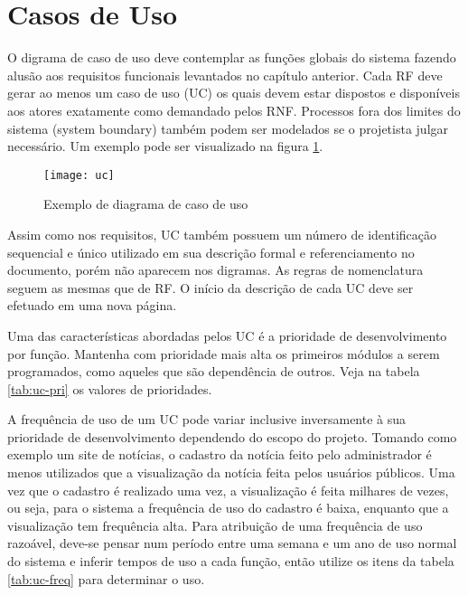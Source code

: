 \documentclass[12pt,openright,a4paper,brazil]{abntex2}
\begin{document}
\section{Casos de Uso}

O digrama de caso de uso deve contemplar as funções globais do sistema fazendo alusão aos requisitos funcionais levantados no capítulo anterior. Cada RF deve gerar ao menos um caso de uso (UC) os quais devem estar dispostos e disponíveis aos atores exatamente como demandado pelos RNF. Processos fora dos limites do sistema (system boundary) também podem ser modelados se o projetista julgar necessário. Um exemplo pode ser visualizado na figura \ref{fig:uc}.

\begin{figure}[!h]
	\centering
	\texttt{[image: uc]}
	\caption{Exemplo de diagrama de caso de uso}
	\label{fig:uc}
\end{figure}

Assim como nos requisitos, UC também possuem um número de identificação sequencial e único utilizado em sua descrição formal e referenciamento no documento, porém não aparecem nos digramas. As regras de nomenclatura seguem as mesmas que de RF. O início da descrição de cada UC deve ser efetuado em uma nova página.

Uma das características abordadas pelos UC é a prioridade de desenvolvimento por função. Mantenha com prioridade mais alta os primeiros módulos a serem programados, como aqueles que são dependência de outros. Veja na tabela \ref{tab:uc-pri} os valores de prioridades.

A frequência de uso de um UC pode variar inclusive inversamente à sua prioridade de desenvolvimento dependendo do escopo do projeto. Tomando como exemplo um site de notícias, o cadastro da notícia feito pelo administrador é menos utilizados que a visualização da notícia feita pelos usuários públicos. Uma vez que o cadastro é realizado uma vez, a visualização é feita milhares de vezes, ou seja, para o sistema a frequência de uso do cadastro é baixa, enquanto que a visualização tem frequência alta. Para atribuição de uma frequência de uso razoável, deve-se pensar num período entre uma semana e um ano de uso normal do sistema e inferir tempos de uso a cada função, então utilize os itens da tabela \ref{tab:uc-freq} para determinar o uso.
\end{document}
